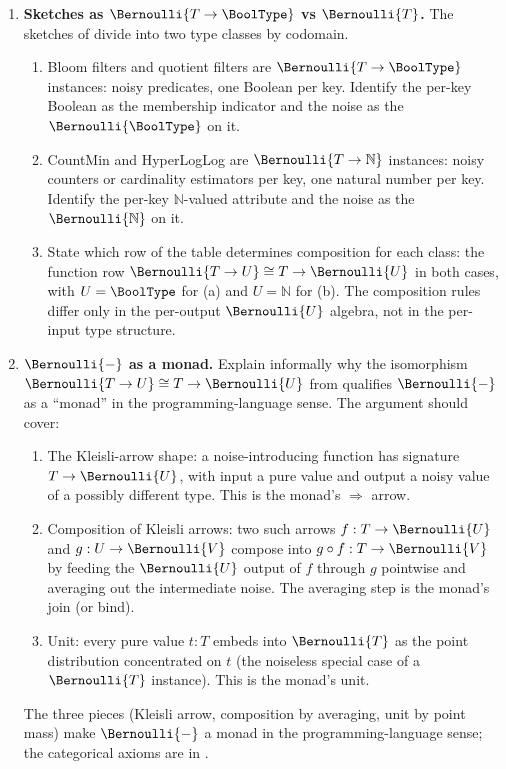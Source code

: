 \begin{enumerate}
\item \exstarstar
\label{ex:ch13-5}
\textbf{Sketches as $\Bernoulli{T \to \BoolType}$ vs $\Bernoulli{T}$.}
The sketches of  divide into two type
classes by codomain.
\begin{enumerate}
  \item[(a)] Bloom filters and quotient filters are
    $\Bernoulli{T \to \BoolType}$ instances: noisy predicates,
    one Boolean per key. Identify the per-key Boolean as the
    membership indicator and the noise as the
    $\Bernoulli{\BoolType}$ on it.
  \item[(b)] CountMin and HyperLogLog are $\Bernoulli{T \to
    \mathbb{N}}$ instances: noisy counters or cardinality estimators
    per key, one natural number per key. Identify the
    per-key $\mathbb{N}$-valued attribute and the noise as the
    $\Bernoulli{\mathbb{N}}$ on it.
  \item[(c)] State which row of the
     table determines composition
    for each class: the function row $\Bernoulli{T \to U} \cong
    T \to \Bernoulli{U}$ in both cases, with $U = \BoolType$ for
    (a) and $U = \mathbb{N}$ for (b). The composition rules
    differ only in the per-output $\Bernoulli{U}$ algebra, not in
    the per-input type structure.
\end{enumerate}

\item \exstarstar
\label{ex:ch13-6}
\textbf{$\Bernoulli{-}$ as a monad.}
Explain informally why the isomorphism $\Bernoulli{T \to U} \cong
T \to \Bernoulli{U}$ from  qualifies
$\Bernoulli{-}$ as a ``monad'' in the programming-language sense.
The argument should cover:
\begin{enumerate}
  \item[(a)] The Kleisli-arrow shape: a noise-introducing function
    has signature $T \to \Bernoulli{U}$, with input a pure value and
    output a noisy value of a possibly different type. This is the
    monad's $\Rightarrow$ arrow.
  \item[(b)] Composition of Kleisli arrows: two such arrows
    $f : T \to \Bernoulli{U}$ and $g : U \to \Bernoulli{V}$ compose
    into $g \circ f : T \to \Bernoulli{V}$ by feeding the
    $\Bernoulli{U}$ output of $f$ through $g$ pointwise and
    averaging out the intermediate noise. The averaging step is the
    monad's join (or bind).
  \item[(c)] Unit: every pure value $t : T$ embeds into
    $\Bernoulli{T}$ as the point distribution concentrated on $t$
    (the noiseless special case of a $\Bernoulli{T}$ instance). This
    is the monad's unit.
\end{enumerate}
The three pieces (Kleisli arrow, composition by averaging, unit by
point mass) make $\Bernoulli{-}$ a monad in the
programming-language sense; the categorical axioms are
in \textcite{wadler-1992}.


\end{enumerate}
